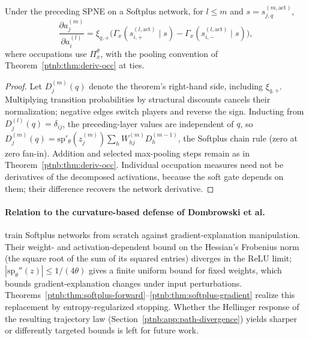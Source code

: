 \begin{theoremenv}\label{ptnb:thm:softplus-gradient}
Under the preceding SPNE on a Softplus network, for $l\le m$ and $s=s_{j,q}^{(m,\mathrm{act})}$,
\begin{equation}
    \frac{\partial a_j^{(m)}}{\partial a_i^{(l)}}=
    \xi_{q,+}\bigl(\Gamma_x(s_{i,+}^{(l,\mathrm{act})}\mid s)
                 -\Gamma_x(s_{i,-}^{(l,\mathrm{act})}\mid s)\bigr),
\end{equation}
where occupations use $\Pi_x^\theta$, with the pooling convention of
Theorem~\ref{ptnb:thm:deriv-occ} at ties.
\end{theoremenv}
\begin{proof}
Let $D_j^{(m)}(q)$ denote the theorem's right-hand side, including $\xi_{q,+}$.
Multiplying transition probabilities by structural discounts cancels their normalization;
negative edges switch players and reverse the sign. Inducting from
$D_j^{(l)}(q)=\delta_{ij}$, the preceding-layer values are independent of $q$, so
$D_j^{(m)}(q)=\mathrm{sp}'_\theta(z_j^{(m)})\sum_hW_{hj}^{(m)}D_h^{(m-1)}$,
the Softplus chain rule (zero at zero fan-in). Addition and selected max-pooling steps remain as
in Theorem~\ref{ptnb:thm:deriv-occ}. Individual occupation measures need not be derivatives of the decomposed activations, because the soft gate depends on them; their difference recovers the network derivative.
\end{proof}

\paragraph{Relation to the curvature-based defense of Dombrowski et al.}\label{ptnb:app:softplus-dombrowski}
\textcite{Dombrowski2020} train Softplus networks from scratch against gradient-explanation
manipulation. Their weight- and activation-dependent bound on the Hessian's Frobenius norm (the square root of the sum of its squared entries) diverges in the
ReLU limit; $|\mathrm{sp}_\theta''(z)|\le1/(4\theta)$ gives a finite uniform bound for fixed weights,
which bounds gradient-explanation changes under input perturbations.
Theorems~\ref{ptnb:thm:softplus-forward}--\ref{ptnb:thm:softplus-gradient} realize this replacement by
entropy-regularized stopping. Whether the Hellinger response of the resulting trajectory law (Section~\ref{ptnb:app:path-divergence}) yields sharper or differently targeted bounds is left for future work.

